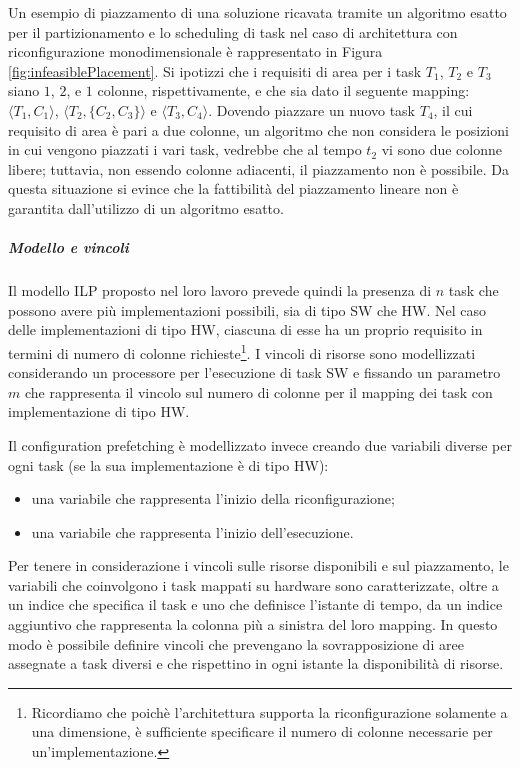 Un esempio di piazzamento di una soluzione ricavata tramite un algoritmo esatto 
per il partizionamento e lo scheduling di task nel caso di 
architettura con riconfigurazione monodimensionale è rappresentato in 
Figura \ref{fig:infeasiblePlacement}. Si ipotizzi che i requisiti di area per i 
task $T_1$, $T_2$ e $T_3$ siano $1$, $2$, e $1$ colonne, rispettivamente, e che 
sia dato il seguente mapping: $\langle T_1, C_1 \rangle$, $\langle T_2, \{C_2, 
C_3\} \rangle$ e $\langle T_3, C_4 \rangle$. Dovendo piazzare un nuovo task 
$T_4$, il cui requisito di area è pari a due colonne, un algoritmo che non 
considera le posizioni in cui vengono piazzati i vari task, vedrebbe che al 
tempo $t_2$ vi sono due colonne libere; tuttavia, non essendo colonne 
adiacenti, il piazzamento non è possibile. Da questa situazione si evince che 
la fattibilità del piazzamento lineare non è garantita dall'utilizzo di un 
algoritmo esatto.

\subparagraph{Modello e vincoli}
Il modello \ac{ILP} proposto nel loro lavoro prevede quindi la presenza di $n$ 
task che possono avere più implementazioni possibili, sia di tipo SW che HW. 
Nel caso delle implementazioni di tipo HW, ciascuna di esse ha un proprio 
requisito in termini di numero di colonne richieste\footnote{Ricordiamo che 
poichè l'architettura supporta la riconfigurazione solamente a una dimensione, 
è sufficiente specificare il numero di colonne necessarie per 
un'implementazione.}. I vincoli di risorse sono modellizzati considerando un 
processore per l'esecuzione di task SW e fissando un parametro $m$ che 
rappresenta il vincolo sul numero di colonne per il mapping dei task con 
implementazione di tipo HW.

Il configuration prefetching è modellizzato invece creando due variabili 
diverse per ogni task (se la sua implementazione è di tipo HW):
\begin{itemize}
 \item una variabile che rappresenta l'inizio della riconfigurazione;
 \item una variabile che rappresenta l'inizio dell'esecuzione.
\end{itemize}
Per tenere in considerazione i vincoli sulle risorse disponibili e sul 
piazzamento, le variabili che coinvolgono i task mappati su hardware sono 
caratterizzate, oltre a un indice che specifica il task e uno che definisce 
l'istante di tempo, da un indice aggiuntivo che rappresenta la colonna più a 
sinistra del loro mapping. In questo modo è possibile definire vincoli che 
prevengano la sovrapposizione di aree assegnate a task diversi e che rispettino 
in ogni istante la disponibilità di risorse.

